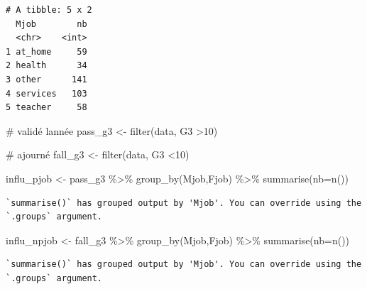 \documentclass[
  letterpaper,
  DIV=11,
  numbers=noendperiod]{scrartcl}
\newenvironment{Shaded}{\begin{snugshade}}{\end{snugshade}}
\newcommand{\AttributeTok}[1]{\textcolor[rgb]{0.40,0.45,0.13}{#1}}
\newcommand{\CommentTok}[1]{\textcolor[rgb]{0.37,0.37,0.37}{#1}}
\newcommand{\DecValTok}[1]{\textcolor[rgb]{0.68,0.00,0.00}{#1}}
\newcommand{\FunctionTok}[1]{\textcolor[rgb]{0.28,0.35,0.67}{#1}}
\newcommand{\NormalTok}[1]{\textcolor[rgb]{0.00,0.23,0.31}{#1}}
\newcommand{\OtherTok}[1]{\textcolor[rgb]{0.00,0.23,0.31}{#1}}
\newcommand{\SpecialCharTok}[1]{\textcolor[rgb]{0.37,0.37,0.37}{#1}}
\begin{document}
\begin{verbatim}
# A tibble: 5 x 2
  Mjob        nb
  <chr>    <int>
1 at_home     59
2 health      34
3 other      141
4 services   103
5 teacher     58
\end{verbatim}

\begin{Shaded}
\begin{Highlighting}[]
\CommentTok{\# validé l\textquotesingle{}année}
\NormalTok{pass\_g3 }\OtherTok{\textless{}{-}} \FunctionTok{filter}\NormalTok{(data, G3 }\SpecialCharTok{\textgreater{}}\DecValTok{10}\NormalTok{)}

\CommentTok{\# ajourné}
\NormalTok{fall\_g3 }\OtherTok{\textless{}{-}} \FunctionTok{filter}\NormalTok{(data, G3 }\SpecialCharTok{\textless{}}\DecValTok{10}\NormalTok{)}

\NormalTok{influ\_pjob }\OtherTok{\textless{}{-}}\NormalTok{ pass\_g3 }\SpecialCharTok{\%\textgreater{}\%} 
  \FunctionTok{group\_by}\NormalTok{(Mjob,Fjob) }\SpecialCharTok{\%\textgreater{}\%}
  \FunctionTok{summarise}\NormalTok{(}\AttributeTok{nb=}\FunctionTok{n}\NormalTok{())}
\end{Highlighting}
\end{Shaded}

\begin{verbatim}
`summarise()` has grouped output by 'Mjob'. You can override using the
`.groups` argument.
\end{verbatim}

\begin{Shaded}
\begin{Highlighting}[]
\NormalTok{influ\_npjob }\OtherTok{\textless{}{-}}\NormalTok{ fall\_g3 }\SpecialCharTok{\%\textgreater{}\%} 
  \FunctionTok{group\_by}\NormalTok{(Mjob,Fjob) }\SpecialCharTok{\%\textgreater{}\%}
  \FunctionTok{summarise}\NormalTok{(}\AttributeTok{nb=}\FunctionTok{n}\NormalTok{())}
\end{Highlighting}
\end{Shaded}

\begin{verbatim}
`summarise()` has grouped output by 'Mjob'. You can override using the
`.groups` argument.
\end{verbatim}

\begin{Shaded}
\end{Shaded}
\end{document}
